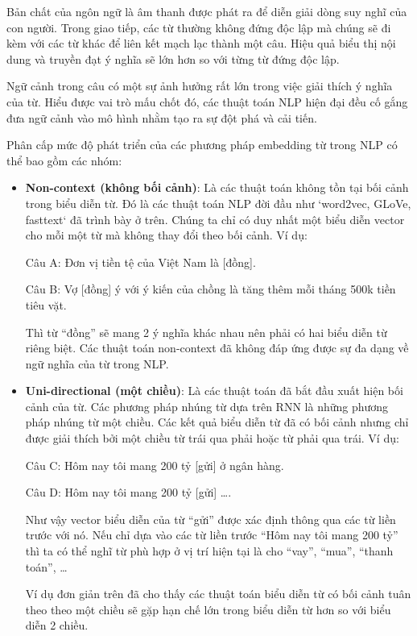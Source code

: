 Bản chất của ngôn ngữ là âm thanh được phát ra để diễn giải dòng suy nghĩ của con người. Trong giao tiếp, các từ thường không đứng độc lập mà chúng sẽ đi kèm với các từ khác để liên kết mạch lạc thành một câu. Hiệu quả biểu thị nội dung và truyền đạt ý nghĩa sẽ lớn hơn so với từng từ đứng độc lập\cite{webpage20}.

Ngữ cảnh trong câu có một sự ảnh hưởng rất lớn trong việc giải thích ý nghĩa của từ. Hiểu được vai trò mấu chốt đó, các thuật toán NLP hiện đại đều cố gắng đưa ngữ cảnh vào mô hình nhằm tạo ra sự đột phá và cải tiến.

Phân cấp mức độ phát triển của các phương pháp embedding từ trong NLP có thể bao gồm các nhóm:
\begin{itemize}
    \item \textbf{Non-context (không bối cảnh)}: Là các thuật toán không tồn tại bối cảnh trong biểu diễn từ. Đó là các thuật toán NLP đời đầu như `word2vec, GLoVe, fasttext` đã trình bày ở trên. Chúng ta chỉ có duy nhất một biểu diễn vector cho mỗi một từ mà không thay đổi theo bối cảnh. Ví dụ:

    Câu A: Đơn vị tiền tệ của Việt Nam là [đồng].
    
    Câu B: Vợ [đồng] ý với ý kiến của chồng là tăng thêm mỗi tháng 500k tiền tiêu vặt.
    
    Thì từ ``đồng'' sẽ mang 2 ý nghĩa khác nhau nên phải có hai biểu diễn từ riêng biệt. Các thuật toán non-context đã không đáp ứng được sự đa dạng về ngữ nghĩa của từ trong NLP.

    \item \textbf{Uni-directional (một chiều)}: Là các thuật toán đã bắt đầu xuất hiện bối cảnh của từ. Các phương pháp nhúng từ dựa trên RNN là những phương pháp nhúng từ một chiều. Các kết quả biểu diễn từ đã có bối cảnh nhưng chỉ được giải thích bởi một chiều từ trái qua phải hoặc từ phải qua trái. Ví dụ:

    Câu C: Hôm nay tôi mang 200 tỷ [gửi] ở ngân hàng.

    Câu D: Hôm nay tôi mang 200 tỷ [gửi] \dots.

    Như vậy vector biểu diễn của từ ``gửi'' được xác định thông qua các từ liền trước với nó. Nếu chỉ dựa vào các từ liền trước ``Hôm nay tôi mang 200 tỷ'' thì ta có thể nghĩ từ phù hợp ở vị trí hiện tại là cho ``vay'', ``mua'', ``thanh toán'', \dots

    Ví dụ đơn giản trên đã cho thấy các thuật toán biểu diễn từ có bối cảnh tuân theo theo một chiều sẽ gặp hạn chế lớn trong biểu diễn từ hơn so với biểu diễn 2 chiều.


\end{itemize}
